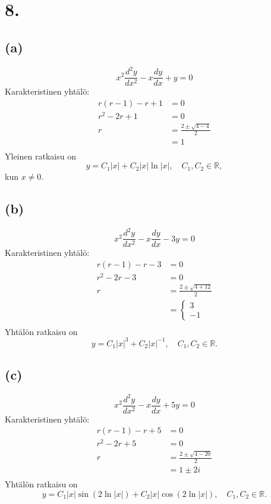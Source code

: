 \documentclass{article}
\begin{document}
\section*{8.}

\subsection*{(a)}

\[
  x^2\frac{d^2 y}{d x^2} - x\frac{dy}{dx} + y = 0
\]
Karakteristinen yhtälö:
\begin{align*}
  r(r - 1) - r + 1 &= 0 \\
  r^2 - 2r + 1 &= 0 \\
  r &= \frac{2 \pm \sqrt{4 - 4}}{2} \\
    &= 1 \\
\end{align*}
Yleinen ratkaisu on
\[
  y = C_1|x| + C_2|x|\ln|x|, \quad C_1,C_2 \in \mathbb{R},
\]
kun $x \neq 0$.

\subsection*{(b)}

\[
  x^2\frac{d^2 y}{d x^2} - x\frac{dy}{dx} - 3y = 0
\]
Karakteristinen yhtälö:
\begin{align*}
  r(r-1) - r - 3 &= 0 \\
  r^2 - 2r - 3 &= 0 \\
  r &= \frac{2 \pm \sqrt{4 + 12}}{2} \\
    &= \begin{cases} 3 \\ -1 \end{cases} \\
\end{align*}
Yhtälön ratkaisu on
\[
  y = C_1|x|^3 + C_2|x|^{-1}, \quad C_1, C_2 \in \mathbb{R}.
\]

\subsection*{(c)}

\[
  x^2\frac{d^2 y}{d x^2} - x\frac{dy}{dx} + 5y = 0
\]
Karakteristinen yhtälö:
\begin{align*}
  r(r - 1) - r + 5 &= 0 \\
  r^2 - 2r + 5 &= 0 \\
  r &= \frac{2 \pm \sqrt{4 - 20}}{2} \\
    &= 1 \pm 2i \\
\end{align*}
Yhtälön ratkaisu on
\[
  y = C_1|x|\sin(2\ln |x|) + C_2|x|\cos(2\ln |x|), \quad C_1,C_2 \in \mathbb{R}.
\]
\end{document}
